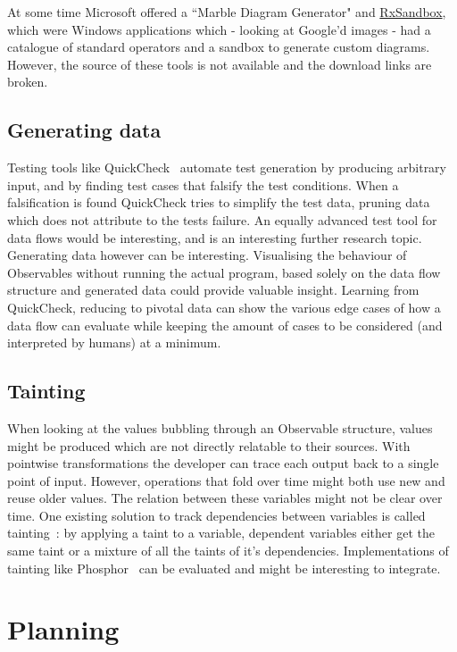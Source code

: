 At some time Microsoft offered a ``Marble Diagram Generator" and \href{http://mnajder.blogspot.nl/2010/03/rxsandbox-v1.html}
{RxSandbox}, which were Windows applications which - looking at Google'd
images - had a catalogue of standard operators and a sandbox to generate
custom diagrams.  However, the source of these tools is not available
and the download links are broken.

\subsection{Generating data}%
\label{sec:gen-data} Testing tools like QuickCheck~\cite{quickcheck}
automate test generation by producing arbitrary input, and by finding
test cases that falsify the test conditions.  When a falsification is
found QuickCheck tries to simplify the test data, pruning data which
does not attribute to the tests failure.  An equally advanced test tool
for data flows would be interesting, and is an interesting further
research topic.  Generating data however can be interesting.
Visualising the behaviour of Observables without running the actual
program, based solely on the data flow structure and generated data
could provide valuable insight.  Learning from QuickCheck, reducing to
pivotal data can show the various edge cases of how a data flow can
evaluate while keeping the amount of cases to be considered (and
interpreted by humans) at a minimum.

\subsection{Tainting}%
When looking at the values bubbling through an Observable structure,
values might be produced which are not directly relatable to their
sources.  With pointwise transformations the developer can trace each
output back to a single point of input.  However, operations that fold
over time might both use new and reuse older values.  The relation
between these variables might not be clear over time.  One existing
solution to track dependencies between variables is called tainting~\cite
{bell2015dynamic}:  by applying a taint to a variable, dependent
variables either get the same taint or a mixture of all the taints of
it's dependencies.  Implementations of tainting like Phosphor~\cite{bell2014phosphor}
can be evaluated and might be interesting to integrate.

\section{Planning}

